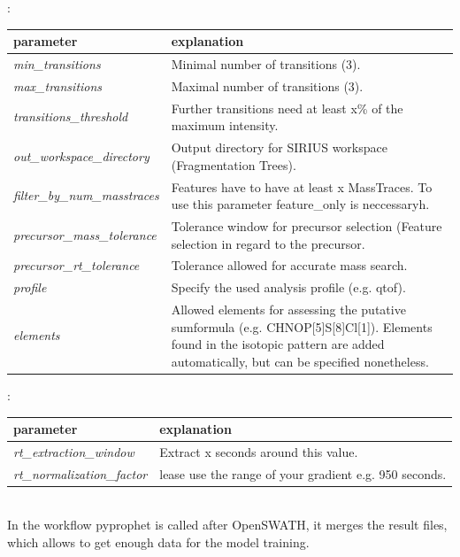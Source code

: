 \noindent{}:
\begin{center}
\begin{tabular*}{\textwidth}{ p{5.5cm}|p{10.5cm} }
\textbf{parameter} & \textbf{explanation} \\ \hline
\textit{min\_transitions} & Minimal number of transitions (3). \\
\textit{max\_transitions} &  Maximal number of transitions (3). \\
\textit{transitions\_threshold} & Further transitions need at least x\% of the maximum intensity. \\
\textit{out\_workspace\_directory} & Output directory for SIRIUS workspace (Fragmentation Trees). \\
\textit{filter\_by\_num\_masstraces} &  Features have to have at least x MassTraces. To use this parameter feature\_only is neccessaryh. \\
\textit{precursor\_mass\_tolerance} & Tolerance window for precursor selection (Feature selection in regard to the precursor. \\
\textit{precursor\_rt\_tolerance} & Tolerance allowed for accurate mass search. \\
\textit{profile} & Specify the used analysis profile (e.g. qtof). \\
\textit{elements} & Allowed elements for assessing the putative sumformula (e.g. CHNOP[5]S[8]Cl[1]). Elements found in the isotopic pattern are added automatically, but can be specified nonetheless. \\
\end{tabular*}
\end{center}

\noindent{}:
\begin{center}
\begin{tabular*}{\textwidth}{ p{5.5cm}|p{10.5cm} }
\textbf{parameter} & \textbf{explanation} \\ \hline
\textit{rt\_extraction\_window} & Extract x seconds around this value. \\
\textit{rt\_normalization\_factor} &  lease use the range of your gradient e.g. 950 seconds. \\
\end{tabular*}
\end{center} \\

\noindent In the workflow pyprophet is called after OpenSWATH, it merges the result files, which allows to get enough data for the model training. 

